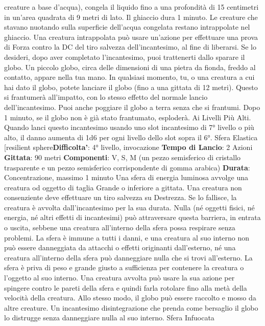 \begin{multicols}{2}
creature a base d’acqua), congela il liquido fino a una
profondità di 15 centimetri in un’area quadrata di 9 metri
di lato. Il ghiaccio dura 1 minuto. Le creature che
stavano nuotando sulla superficie dell’acqua congelata
restano intrappolate nel ghiaccio. Una creatura
intrappolata può usare un’azione per effettuare una
prova di Forza contro la DC del tiro salvezza
dell’incantesimo, al fine di liberarsi.
Se lo desideri, dopo aver completato l’incantesimo, puoi
trattenerti dallo sparare il globo. Un piccolo globo, circa
delle dimensioni di una pietra da fionda, freddo al
contatto, appare nella tua mano. In qualsiasi momento,
tu, o una creatura a cui hai dato il globo, potete lanciare
il globo (fino a una gittata di 12 metri). Questo si
frantumerà all’impatto, con lo stesso effetto del normale
lancio dell’incantesimo. Puoi anche poggiare il globo a
terra senza che si frantumi. Dopo 1 minuto, se il globo
non è già stato frantumato, esploderà.
Ai Livelli Più Alti. Quando lanci questo incantesimo
usando uno slot incantesimo di 7° livello o più alto, il
danno aumenta di 1d6 per ogni livello dello slot sopra il
6°.
Sfera Elastica
[resilient sphere\textbf{Difficolta'}:
4° livello, invocazione
\textbf{Tempo di Lancio}: 2 Azioni
\textbf{Gittata}: 90 metri
\textbf{Componenti}: V, S, M (un pezzo semisferico di cristallo
trasparente e un pezzo semisferico corrispondente di
gomma arabica)
\textbf{Durata}: Concentrazione, massimo 1 minuto
Una sfera di energia luminosa avvolge una creatura od
oggetto di taglia Grande o inferiore a gittata. Una
creatura non consenziente deve effettuare un tiro 
salvezza su Destrezza. Se lo fallisce, la creatura è
avvolta dall’incantesimo per la sua durata.
Nulla (né oggetti fisici, né energia, né altri effetti di
incantesimi) può attraversare questa barriera, in entrata
o uscita, sebbene una creatura all’interno della sfera
possa respirare senza problemi. La sfera è immune a
tutti i danni, e una creatura al suo interno non può
essere danneggiata da attacchi o effetti originanti
dall’esterno, né una creatura all’interno della sfera può
danneggiare nulla che si trovi all’esterno.
La sfera è priva di peso e grande giusto a sufficienza
per contenere la creatura o l’oggetto al suo interno. Una
creatura avvolta può usare la sua azione per spingere
contro le pareti della sfera e quindi farla rotolare fino
alla metà della velocità della creatura. Allo stesso
modo, il globo può essere raccolto e mosso da altre
creature.
Un incantesimo disintegrazione che prenda come
bersaglio il globo lo distrugge senza danneggiare nulla
al suo interno.
Sfera Infuocata

\end{multicols}
